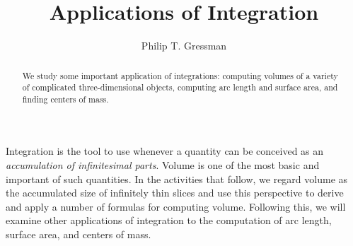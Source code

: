 \documentclass{ximera}
\title{Applications of Integration}
\author{Philip T. Gressman}
\begin{document}
\begin{abstract}
  We study some important application of integrations: computing volumes of a variety of complicated three-dimensional objects, computing arc length and surface area, and finding centers of mass.
\end{abstract}
\maketitle

Integration is the tool to use whenever a quantity can be conceived as an \textit{accumulation of infinitesimal parts}. 
Volume is one of the most basic and important of such quantities. In the activities that follow, we regard volume as the accumulated size of infinitely thin slices and use this perspective to derive and apply a number of formulas for computing volume. Following this, we will examine other applications of integration to the computation of arc length, surface area, and centers of mass.
\end{document}
